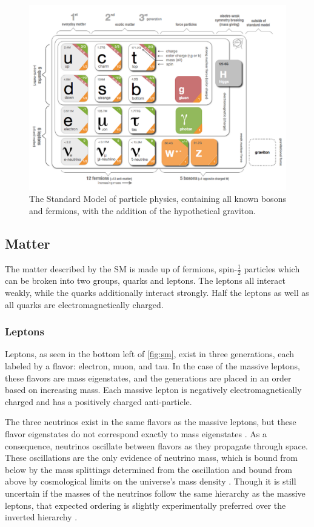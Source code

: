 \begin{centering}
\begin{figure}[bth]
\myfloatalign
\includegraphics[width=.85\linewidth]{figures/theory/standardmodel.png}
\caption{The Standard Model of particle physics, containing all known bosons and fermions, with the addition of the hypothetical graviton. \cite{Galbraith:2012}}
\label{fig:sm}
\end{figure}
\end{centering}

\subsection{Matter}
\label{sec:matter}

The matter described by the \ac{SM} is made up of fermions, spin-$\frac{1}{2}$ particles which can be broken into two groups, quarks and leptons. The leptons all interact weakly, while the quarks additionally interact strongly. Half the leptons as well as all quarks are electromagnetically charged. 

\subsubsection{Leptons}

Leptons, as seen in the bottom left of \autoref{fig:sm}, exist in three generations, each labeled by a flavor: electron, muon, and tau. In the case of the massive leptons, these flavors are mass eigenstates, and the generations are placed in an order based on increasing mass. Each massive lepton is negatively electromagnetically charged and has a positively charged anti-particle. 

The three neutrinos exist in the same flavors as the massive leptons, but these flavor eigenstates do not correspond exactly to mass eigenstates \cite{Griffiths:111880}. As a consequence, neutrinos oscillate between flavors as they propagate through space. These oscillations are the only evidence of neutrino mass, which is bound from below by the mass splittings determined from the oscillation and bound from above by cosmological limits on the universe's mass density \cite{1979PhLB...87..144H}. Though it is still uncertain if the masses of the neutrinos follow the same hierarchy as the massive leptons, that expected ordering is slightly experimentally preferred over the inverted hierarchy \cite{Huang:2016}. 

